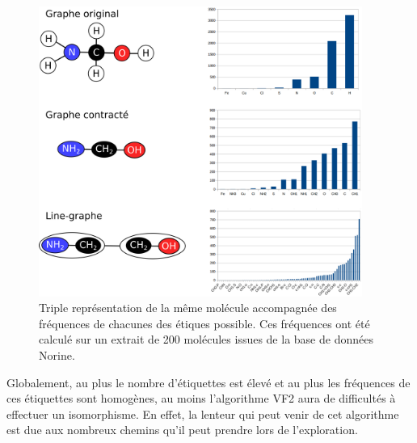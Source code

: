 \begin{figure}[!ht]
  \begin{center}
    \includegraphics[width=400px]{Figures/s2m/representations/all.png}
    \caption{\label{representations}Triple représentation de la même molécule accompagnée des fréquences de chacunes des étiques possible. Ces fréquences ont été calculé sur un extrait de 200 molécules issues de la base de données Norine.}
  \end{center}
\end{figure}

Globalement, au plus le nombre d'étiquettes est élevé et au plus les fréquences de ces étiquettes sont homogènes, au moins l'algorithme VF2 aura de difficultés à effectuer un isomorphisme.
En effet, la lenteur qui peut venir de cet algorithme est due aux nombreux chemins qu'il
peut prendre lors de l'exploration.

